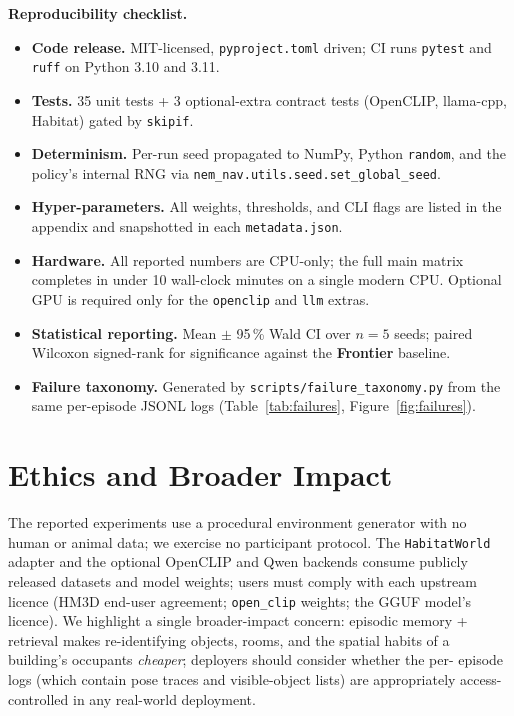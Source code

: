 \documentclass[conference,a4paper,10pt]{IEEEtran}
\begin{document}
\textbf{Reproducibility checklist.}
\begin{itemize}[leftmargin=*]
\item \textbf{Code release.} MIT-licensed, \texttt{pyproject.toml}
  driven; CI runs \texttt{pytest} and \texttt{ruff} on Python 3.10 and
  3.11.
\item \textbf{Tests.} 35 unit tests + 3 optional-extra contract tests
  (OpenCLIP, llama-cpp, Habitat) gated by \texttt{skipif}.
\item \textbf{Determinism.} Per-run seed propagated to NumPy, Python
  \texttt{random}, and the policy's internal RNG via
  \texttt{nem\_nav.utils.seed.set\_global\_seed}.
\item \textbf{Hyper-parameters.} All weights, thresholds, and CLI flags
  are listed in the appendix and snapshotted in each
  \texttt{metadata.json}.
\item \textbf{Hardware.} All reported numbers are CPU-only; the full
  main matrix completes in under 10 wall-clock minutes on a single
  modern CPU. Optional GPU is required only for the \texttt{openclip}
  and \texttt{llm} extras.
\item \textbf{Statistical reporting.} Mean $\pm$ 95\,\% Wald CI over
  $n{=}5$ seeds; paired Wilcoxon signed-rank for significance against
  the \textbf{Frontier} baseline.
\item \textbf{Failure taxonomy.} Generated by
  \texttt{scripts/failure\_taxonomy.py} from the same per-episode JSONL
  logs (Table~\ref{tab:failures}, Figure~\ref{fig:failures}).
\end{itemize}

\section*{Ethics and Broader Impact}

The reported experiments use a procedural environment generator with no
human or animal data; we exercise no participant protocol. The
\texttt{HabitatWorld} adapter and the optional OpenCLIP and Qwen
backends consume publicly released datasets and model weights; users
must comply with each upstream licence (HM3D end-user agreement;
\texttt{open\_clip} weights; the GGUF model's licence). We highlight a
single broader-impact concern: episodic memory + retrieval makes
re-identifying objects, rooms, and the spatial habits of a building's
occupants \emph{cheaper}; deployers should consider whether the per-
episode logs (which contain pose traces and visible-object lists) are
appropriately access-controlled in any real-world deployment.


\end{document}
